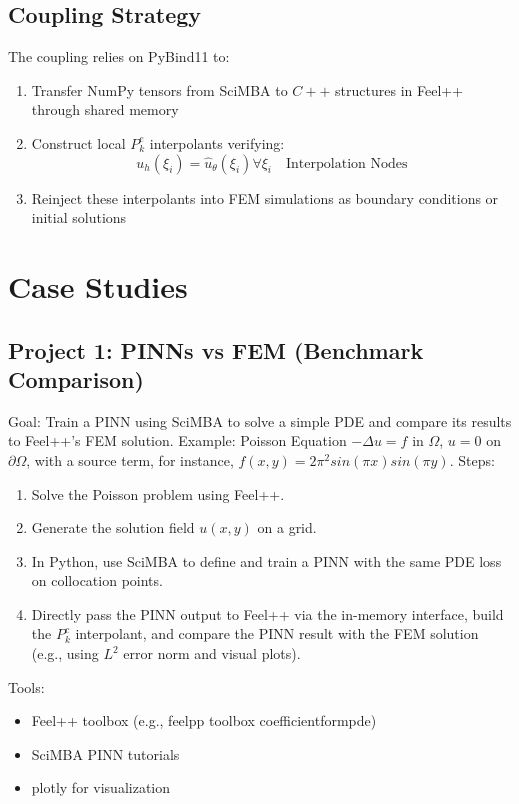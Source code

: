 \documentclass[12pt]{article}
\begin{document}
\subsection{Coupling Strategy}

The coupling relies on PyBind11 to:

\begin{enumerate}
    \item Transfer NumPy tensors from SciMBA to $C++$ structures in Feel++ through shared memory
    \item Construct local $P_{k}^{e}$ interpolants verifying:
    $$u_{h}(\xi_{i})=\hat{u}_{\theta}(\xi_{i})\forall\xi_{i} \quad \text{Interpolation Nodes}$$
    \item Reinject these interpolants into FEM simulations as boundary conditions or initial solutions
\end{enumerate}

\section{Case Studies}

\subsection{Project 1: PINNs vs FEM (Benchmark Comparison)}

Goal: Train a PINN using SciMBA to solve a simple PDE and compare its results to Feel++'s FEM solution.  Example: Poisson Equation $-\Delta u=f$ in $\Omega$, $u=0$ on $\partial\Omega$, with a source term, for instance, $f(x,y)=2\pi^{2}sin(\pi x)sin(\pi y)$.  Steps:

\begin{enumerate}
    \item Solve the Poisson problem using Feel++. 
    \item Generate the solution field $u(x,y)$ on a grid. 
    \item In Python, use SciMBA to define and train a PINN with the same PDE loss on collocation points. 
    \item Directly pass the PINN output to Feel++ via the in-memory interface, build the $P_{k}^{c}$ interpolant, and compare the PINN result with the FEM solution (e.g., using $L^{2}$ error norm and visual plots). 
\end{enumerate}

Tools:

\begin{itemize}
    \item Feel++ toolbox (e.g., feelpp toolbox coefficientformpde)
    \item SciMBA PINN tutorials
    \item plotly for visualization 
\end{itemize}
\end{document}
